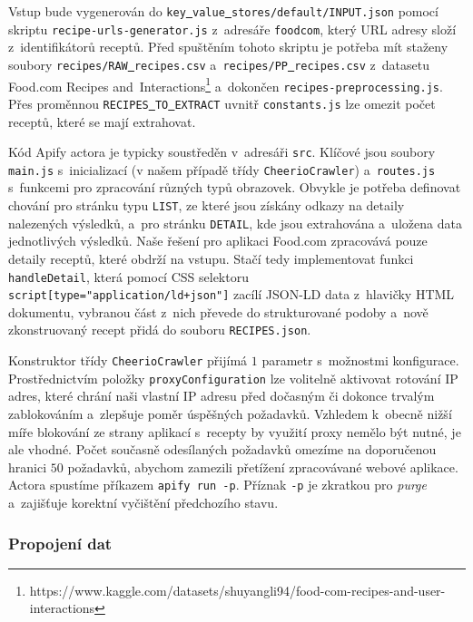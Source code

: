 Vstup bude vygenerován do \texttt{key\underline{{ }}value\underline{{ }}stores/default/INPUT.json} pomocí skriptu \texttt{recipe-urls-generator.js} z~adresáře \texttt{foodcom}, který URL adresy složí z~identifikátorů receptů. Před spuštěním tohoto skriptu je potřeba mít staženy soubory \texttt{recipes/RAW\underline{{ }}recipes.csv} a~\texttt{recipes/PP\underline{{ }}recipes.csv} z~datasetu Food.com Recipes and~Interactions\footnote{https://www.kaggle.com/datasets/shuyangli94/food-com-recipes-and-user-interactions} a~dokončen \texttt{recipes-preprocessing.js}. Přes proměnnou \texttt{RECIPES\underline{{ }}TO\underline{{ }}EXTRACT} uvnitř \texttt{constants.js} lze omezit počet receptů, které se mají extrahovat.

Kód Apify actora je typicky soustředěn v~adresáři \texttt{src}. Klíčové jsou soubory \texttt{main.js} s~inicializací (v našem případě třídy \texttt{CheerioCrawler}) a~\texttt{routes.js} s~funkcemi pro zpracování různých typů obrazovek. Obvykle je potřeba definovat chování pro stránku typu \texttt{LIST}, ze které jsou získány odkazy na detaily nalezených výsledků, a~pro stránku \texttt{DETAIL}, kde jsou extrahována a~uložena data jednotlivých výsledků. Naše řešení pro aplikaci Food.com zpracovává pouze detaily receptů, které obdrží na vstupu. Stačí tedy implementovat funkci \texttt{handleDetail}, která pomocí CSS selektoru \texttt{script[type="application/ld+json"]} zacílí JSON-LD data z~hlavičky HTML dokumentu, vybranou část z~nich převede do strukturované podoby a~nově zkonstruovaný recept přidá do souboru \texttt{RECIPES.json}.

Konstruktor třídy \texttt{CheerioCrawler} přijímá $1$ parametr s~možnostmi konfigurace. Prostřednictvím položky \texttt{proxyConfiguration} lze volitelně aktivovat rotování IP adres, které chrání naši vlastní IP adresu před dočasným či dokonce trvalým zablokováním a~zlepšuje poměr úspěšných požadavků. Vzhledem k~obecně nižší míře blokování ze strany aplikací s~recepty by využití proxy nemělo být nutné, je ale vhodné. Počet současně odesílaných požadavků omezíme na doporučenou hranici $50$ požadavků, abychom zamezili přetížení zpracovávané webové aplikace. Actora spustíme příkazem \texttt{apify\,run\,-p}. Příznak \texttt{-p} je zkratkou pro \emph{purge} a~zajišťuje korektní vyčištění předchozího stavu.

\subsubsection{Propojení dat}

